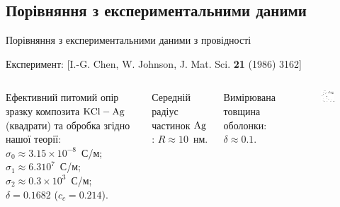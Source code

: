 \documentclass[10pt]{beamer}
\begin{document}
\subsection{Порівняння з експериментальними даними}
\begin{frame}{Порівняння з експериментальними даними з провідності}

    \scriptsize{Експеримент: [I.-G. Chen, W. Johnson, J. Mat. Sci. {\bf 21} (1986) 3162]}
    
\footnotesize
\begin{columns}[T,onlytextwidth]
    \vspace{10pt}
      Ефективний питомий опір зразку композита $\rm KCl-Ag$ (квадрати) та обробка згідно нашої теорії: \\
      $\sigma_0 \approx 3.15 \times 10^{-8}$~С/м; \\
      $\sigma_1 \approx 6.3 10^7$~С/м; $\sigma_2 \approx 0.3 \times 10^3$~С/м; \\
      $\delta = 0.1682$ ($c_c = 0.214$).

      \vspace{5pt}
      Середній радіус частинок $\rm Ag$: $R\approx 10$~нм. 
      
      Вимірювана товщина оболонки: $\delta \approx 0.1$.

      \begin{figure}
        \centering
        \includegraphics[width=0.99\textwidth]{images/grannan-sigma-fin.eps}
      \end{figure}
\end{columns}

\end{frame}
\end{document}
